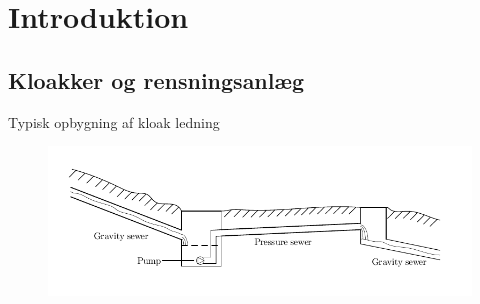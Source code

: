 

\section{Introduktion} %


\subsection{Kloakker og rensningsanlæg} %
\begin{frame}{Typisk opbygning af kloak ledning}{}
\vfill\vfill\centering
\begin{figure}[H]
\centering
\includegraphics[width=1\textwidth]{Sections/pictures/Sewer_drawing.pdf}
\end{figure}
\vfill\vfill
\end{frame}
%


